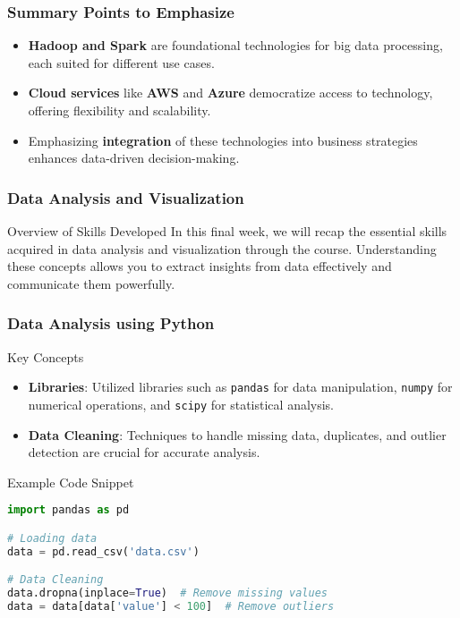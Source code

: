\documentclass{beamer}
\begin{document}
\begin{frame}[fragile]
    \frametitle{Summary Points to Emphasize}
    \begin{itemize}
        \item \textbf{Hadoop and Spark} are foundational technologies for big data processing, each suited for different use cases.
        \item \textbf{Cloud services} like \textbf{AWS} and \textbf{Azure} democratize access to technology, offering flexibility and scalability.
        \item Emphasizing \textbf{integration} of these technologies into business strategies enhances data-driven decision-making.
    \end{itemize}
\end{frame}

\begin{frame}
    \frametitle{Data Analysis and Visualization}
    \begin{block}{Overview of Skills Developed}
        In this final week, we will recap the essential skills acquired in data analysis and visualization through the course. 
        Understanding these concepts allows you to extract insights from data effectively and communicate them powerfully.
    \end{block}
\end{frame}

\begin{frame}[fragile]
    \frametitle{Data Analysis using Python}
    \begin{block}{Key Concepts}
        \begin{itemize}
            \item \textbf{Libraries}: Utilized libraries such as \texttt{pandas} for data manipulation, 
                  \texttt{numpy} for numerical operations, and \texttt{scipy} for statistical analysis.
            \item \textbf{Data Cleaning}: Techniques to handle missing data, duplicates, and outlier detection are crucial for accurate analysis.
        \end{itemize}
    \end{block}
    
    \begin{block}{Example Code Snippet}
        \begin{lstlisting}[language=Python]
import pandas as pd

# Loading data
data = pd.read_csv('data.csv')

# Data Cleaning
data.dropna(inplace=True)  # Remove missing values
data = data[data['value'] < 100]  # Remove outliers
        \end{lstlisting}
    \end{block}
\end{frame}
\end{document}
